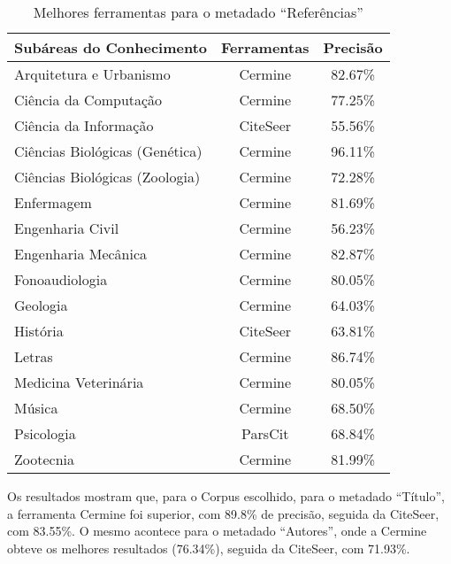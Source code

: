 \begin{table}
    \caption{Melhores ferramentas para o metadado ``Referências''}
    \begin{center}
        \begin{tabular}{|l|c|c|}
            \hline 
            \textbf{Subáreas do Conhecimento} & \textbf{Ferramentas} & \textbf{Precisão} \\ 
            \hline 
            Arquitetura e Urbanismo & Cermine & 82.67\% \\ \hline
            Ciência da Computação & Cermine & 77.25\% \\ \hline
            Ciência da Informação & CiteSeer & 55.56\% \\ \hline
            Ciências Biológicas (Genética) & Cermine & 96.11\% \\ \hline
            Ciências Biológicas (Zoologia) & Cermine & 72.28\% \\ \hline
            Enfermagem & Cermine & 81.69\% \\ \hline
            Engenharia Civil & Cermine & 56.23\% \\ \hline
            Engenharia Mecânica & Cermine & 82.87\% \\ \hline
            Fonoaudiologia & Cermine & 80.05\% \\ \hline
            Geologia & Cermine & 64.03\% \\ \hline
            História & CiteSeer & 63.81\% \\ \hline
            Letras & Cermine & 86.74\% \\ \hline
            Medicina Veterinária & Cermine & 80.05\% \\ \hline
            Música & Cermine & 68.50\% \\ \hline
            Psicologia & ParsCit & 68.84\% \\ \hline
            Zootecnia & Cermine & 81.99\% \\ \hline
        \end{tabular}
    \end{center}
    \label{tab:areas-references-tools}
\end{table}

Os resultados mostram que, para o Corpus escolhido, para o metadado ``Título'', a ferramenta Cermine foi superior, com 89.8\% de precisão, seguida da CiteSeer, com 83.55\%. O mesmo acontece para o metadado ``Autores'', onde a Cermine obteve os melhores resultados (76.34\%), seguida da CiteSeer, com 71.93\%.

